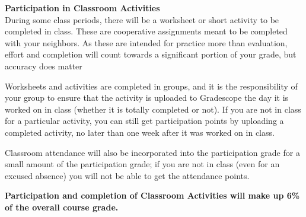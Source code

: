 \documentclass[11pt]{article}
\renewcommand{\emph}[1]{\textsf{\textbf{#1}}}
\newcommand{\localhead}[1]{\par\smallskip\textbf{#1} \smallskip\nobreak\\}%
\def\heading#1{\localhead{\large\emph{#1}}}
\begin{document}

\heading{Participation in Classroom Activities}
During some class periods, there will be a worksheet or short activity
to be completed in class. These are cooperative assignments meant to
be completed with your neighbors. As these are intended for practice
more than evaluation, effort and completion will count towards a
significant portion of your grade, but accuracy does matter

Worksheets and activities are completed in groups, and it is the responsibility of your group to ensure that the activity is uploaded to Gradescope the day it is worked on in class (whether it is totally completed or not). If you are not in class for a particular activity, you can still get participation points by uploading a completed activity, no later than one week after it was worked on in class.

Classroom attendance will also be incorporated into the participation grade for a small amount of the participation grade; if you are not in class (even for an excused absence) you will not be able to get the attendance points.

{\bf Participation and completion of Classroom Activities will make up 6\% of the overall course
grade.} 


\end{document}
